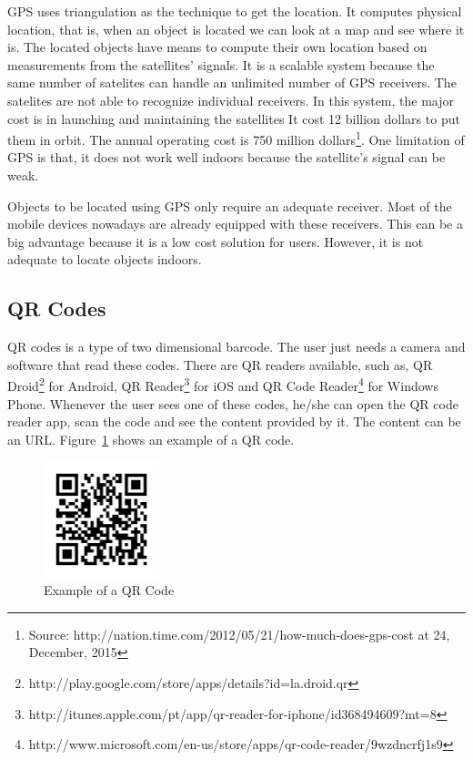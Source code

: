 \gls{GPS} uses triangulation as the technique to get the location.
It computes physical location, that is, when an object is located we can look at a map and see where it is.
The located objects have means to compute their own location based on measurements from the satellites' signals.
It is a scalable system because the same number of satelites can handle an unlimited number of \gls{GPS} receivers.
The satelites are not able to recognize individual receivers.
In this system, the major cost is in launching and maintaining the satellites
It cost 12 billion dollars to put them in orbit. The annual operating cost is 750 million dollars\footnote{Source: http://nation.time.com/2012/05/21/how-much-does-gps-cost at 24, December, 2015}.
One limitation of \gls{GPS} is that, it does not work well indoors because the satellite's signal can be weak.

Objects to be located using \gls{GPS} only require an adequate receiver. Most of the mobile devices nowadays are already equipped with these receivers.
This can be a big advantage because it is a low cost solution for users.
However, it is not adequate to locate objects indoors.

\subsection{QR Codes}
\label{sub:background_qr_codes}
\gls{QR} codes is a type of two dimensional barcode.
The user just needs a camera and software that read these codes.
There are \gls{QR} readers available,
such as, QR Droid\footnote{http://play.google.com/store/apps/details?id=la.droid.qr} for Android, QR Reader\footnote{http://itunes.apple.com/pt/app/qr-reader-for-iphone/id368494609?mt=8} for iOS and QR Code Reader\footnote{http://www.microsoft.com/en-us/store/apps/qr-code-reader/9wzdncrfj1s9} for Windows Phone.
Whenever the user sees one of these codes, he/she can open the \gls{QR} code reader app, scan the code and see the content provided by it.
The content can be an \gls{URL}.
Figure~\ref{fig:qr_code} shows an example of a \gls{QR} code.

\begin{figure}[!ht]
  \centering
    \includegraphics[width=0.3\textwidth, keepaspectratio]{images/qr_code}
    \caption{Example of a QR Code}
    \label{fig:qr_code}
\end{figure}

